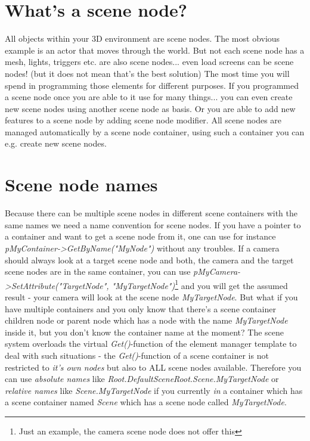 \section{What's a scene node?}
All objects within your 3D environment are scene nodes. The most obvious example is an actor that moves through the world. But not each scene node has a mesh, lights, triggers etc. are also scene nodes... even load screens can be scene nodes! (but it does not mean that's the best solution) The most time you will spend in programming those elements for different purposes. If you programmed a scene node once you are able to it use for many things... you can even create new scene nodes using another scene node as basis. Or you are able to add new features to a scene node by adding scene node modifier. All scene nodes are managed automatically by a scene node container, using such a container you can e.g. create new scene nodes.




\section{Scene node names}
Because there can be multiple scene nodes in different scene containers with the same names we need a name convention for scene nodes. If you have a pointer to a container and want to get a scene node from it, one can use for instance \emph{pMyContainer->GetByName("MyNode")} without any troubles. If a camera should always look at a target scene node and both, the camera and the target scene nodes are in the same container, you can use \emph{pMyCamera->SetAttribute("TargetNode", "MyTargetNode")}\footnote{Just an example, the camera scene node does not offer this} and you will get the assumed result - your camera will look at the scene node \emph{MyTargetNode}. But what if you have multiple containers and you only know that there's a scene container children node or parent node which has a node with the name \emph{MyTargetNode} inside it, but you don't know the container name at the moment? The scene system overloads the virtual \emph{Get()}-function of the element manager template to deal with such situations - the \emph{Get()}-function of a scene container is not restricted to \emph{it's own nodes} but also to ALL scene nodes available. Therefore you can use \emph{absolute names} like \emph{Root.DefaultSceneRoot.Scene.MyTargetNode} or \emph{relative names} like \emph{Scene.MyTargetNode} if you currently \emph{in} a container which has a scene container named \emph{Scene} which has a scene node called \emph{MyTargetNode}.

